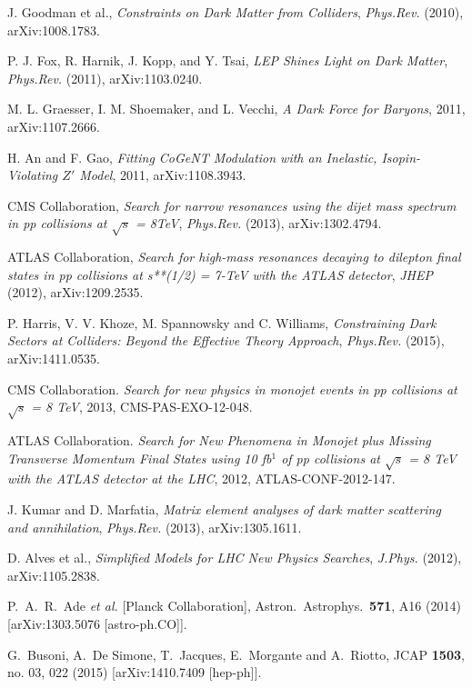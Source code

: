 J. Goodman et al., \emph{Constraints on Dark Matter from Colliders}, \emph{Phys.Rev.} (2010), arXiv:1008.1783.

P. J. Fox, R. Harnik, J. Kopp, and Y. Tsai, \emph{LEP Shines Light on Dark Matter}, \emph{Phys.Rev.} (2011), arXiv:1103.0240.

M. L. Graesser, I. M. Shoemaker, and L. Vecchi, \emph{A Dark Force for Baryons}, 2011, arXiv:1107.2666.

H. An and F. Gao, \emph{Fitting CoGeNT Modulation with an Inelastic, Isopin-Violating $Z'$ Model}, 2011, arXiv:1108.3943.

CMS Collaboration, \emph{
Search for narrow resonances using the dijet mass spectrum in pp collisions at $\sqrt{s}$ = 8TeV}, \emph{Phys.Rev.} (2013), arXiv:1302.4794.

ATLAS Collaboration, \emph{Search for high-mass resonances decaying to dilepton final states in pp collisions at s**(1/2) = 7-TeV with the ATLAS detector}, \emph{JHEP} (2012), arXiv:1209.2535.

P. Harris, V. V. Khoze, M. Spannowsky and C. Williams, \emph{Constraining Dark Sectors at Colliders: Beyond the Effective Theory Approach}, \emph{Phys.Rev.} (2015), arXiv:1411.0535.

CMS Collaboration. \emph{Search for new physics in monojet events in pp collisions at $\sqrt{s}$ = 8 TeV}, 2013, CMS-PAS-EXO-12-048.

ATLAS Collaboration. \emph{Search for New Phenomena in Monojet plus Missing Transverse Momentum Final States using 10 fb$^{1}$ of pp collisions at $\sqrt{s}$ = 8 TeV with the ATLAS detector at the LHC}, 2012, ATLAS-CONF-2012-147.

J. Kumar and D. Marfatia, \emph{Matrix element analyses of dark matter scattering and annihilation}, \emph{Phys.Rev.} (2013), arXiv:1305.1611.

D. Alves et al., \emph{Simplified Models for LHC New Physics Searches}, \emph{J.Phys.} (2012), arXiv:1105.2838.

  P.~A.~R.~Ade {\it et al.}  [Planck Collaboration],
  Astron.\ Astrophys.\  {\bf 571}, A16 (2014)
  [arXiv:1303.5076 [astro-ph.CO]].

  G.~Busoni, A.~De Simone, T.~Jacques, E.~Morgante and A.~Riotto,
  JCAP {\bf 1503}, no. 03, 022 (2015)
  [arXiv:1410.7409 [hep-ph]].
  
